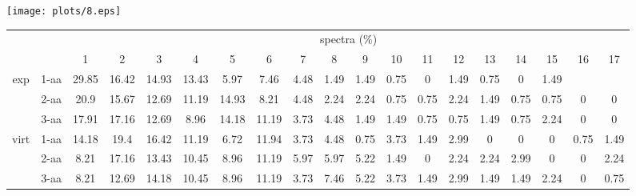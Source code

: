 \documentclass{article}
\begin{document}
\texttt{[image: plots/8.eps]}\begin{table}[h]\tiny
\vspace{3mm}
{\centering
\begin{center}
\begin{tabular}{|c|l|c|c|c|c|c|c|c|c|c|c|c|c|c|c|c|c|c|}
  \hline
  \multicolumn{2}{|c|}{ } & \multicolumn{ 17 }{|c|}{ spectra (\%)} \\
  \cline{3- 19}
  \multicolumn{2}{|c|}{ }  & 1 & 2 & 3 & 4 & 5 & 6 & 7 & 8 & 9 & 10 & 11 & 12 & 13 & 14 & 15 & 16 & 17\\
  \hline
  \multirow{3}{*}{exp}
&  1-aa  & 29.85 & 16.42 & 14.93 & 13.43 & 5.97 & 7.46 & 4.48 & 1.49 & 1.49 & 0.75 & 0 & 1.49 & 0.75 & 0 & 1.49 &  & \\&  2-aa  & 20.9 & 15.67 & 12.69 & 11.19 & 14.93 & 8.21 & 4.48 & 2.24 & 2.24 & 0.75 & 0.75 & 2.24 & 1.49 & 0.75 & 0.75 & 0 & 0\\&  3-aa  & 17.91 & 17.16 & 12.69 & 8.96 & 14.18 & 11.19 & 3.73 & 4.48 & 1.49 & 1.49 & 0.75 & 0.75 & 1.49 & 0.75 & 2.24 & 0 & 0\\ \hline
  \multirow{3}{*}{virt} 
&  1-aa  & 14.18 & 19.4 & 16.42 & 11.19 & 6.72 & 11.94 & 3.73 & 4.48 & 0.75 & 3.73 & 1.49 & 2.99 & 0 & 0 & 0 & 0.75 & 1.49\\&  2-aa  & 8.21 & 17.16 & 13.43 & 10.45 & 8.96 & 11.19 & 5.97 & 5.97 & 5.22 & 1.49 & 0 & 2.24 & 2.24 & 2.99 & 0 & 0 & 2.24\\&  3-aa  & 8.21 & 12.69 & 14.18 & 10.45 & 8.96 & 11.19 & 3.73 & 7.46 & 5.22 & 3.73 & 1.49 & 2.99 & 1.49 & 1.49 & 2.24 & 0 & 0.75\\ \hline
\end{tabular}
\end{center}
\par}
\centering
\vspace{3mm}
\label{table:table8}
\end{table}
\end{document}
